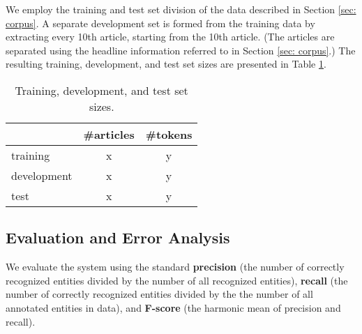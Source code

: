 \documentclass[11pt]{article}
\begin{document}
We employ the training and test set division of the data described in Section \ref{sec: corpus}. A separate development set is formed from the training data by extracting every 10th article, starting from the 10th article. (The articles are separated using the headline information referred to in Section \ref{sec: corpus}.) The resulting training, development, and test set sizes are presented in Table \ref{tab: set sizes}.

\begin{table}[t!]
\begin{center}
\begin{tabular}{lcc} 
 & \#articles & \#tokens \\
\hline
\noalign{\smallskip}
training & x & y  \\
development  & x & y  \\
test & x & y \\
\end{tabular}
\end{center}
\caption{Training, development, and test set sizes.}
\label{tab: set sizes}
\end{table}


\subsection{Evaluation and Error Analysis}
\label{sec: evaluation}

We evaluate the system using the standard \textbf{precision} (the number of correctly recognized entities divided by the number of all recognized entities), \textbf{recall} (the number of correctly recognized entities divided by the the number of all annotated entities in data), and \textbf{F-score} (the harmonic mean of precision and recall). %
\end{document}
